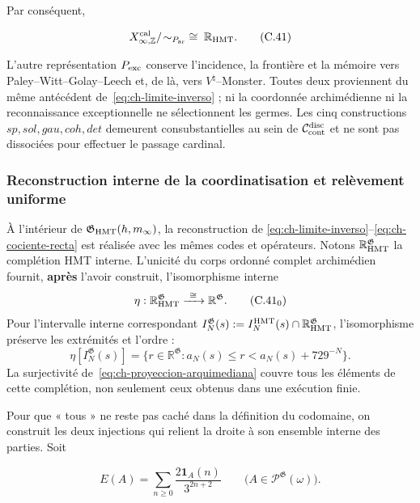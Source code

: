 Par conséquent,

\[
 X_{\infty,\mathbb Z}^{\rm cal}/\!\sim_{P_{\rm ar}}
 \;\cong\;\mathbb R_{\rm HMT}.
\tag{C.41}\label{eq:ch-cociente-recta}
\]

L'autre représentation \(P_{\rm exc}\) conserve l'incidence, la frontière et la mémoire vers Paley--\allowbreak Witt--\allowbreak Golay--\allowbreak Leech et, de là, vers \(V^\natural\)--Monster. Toutes deux proviennent du même antécédent de~\eqref{eq:ch-limite-inverso} ; ni la coordonnée archimédienne ni la reconnaissance exceptionnelle ne sélectionnent les germes. Les cinq constructions \(sp,sol,gau,coh,det\) demeurent consubstantielles au sein de \(\mathcal C_{\rm cont}^{\rm disc}\) et ne sont pas dissociées pour effectuer le passage cardinal.



\subsubsection{Reconstruction interne de la coordinatisation et relèvement uniforme}

À l'intérieur de \(\mathfrak G_{\rm HMT}(h,m_\infty)\), la reconstruction de \eqref{eq:ch-limite-inverso}--\eqref{eq:ch-cociente-recta} est réalisée avec les mêmes codes et opérateurs. Notons \(\mathbb R_{\rm HMT}^{\mathfrak G}\) la complétion HMT interne. L'unicité du corps ordonné complet archimédien fournit, \textbf{après} l'avoir construit, l'isomorphisme interne
\[
 \eta:\mathbb R_{\rm HMT}^{\mathfrak G}
 \xrightarrow{\ \cong\ }\mathbb R^{\mathfrak G}.
\tag{C.41$_0$}\label{eq:ch-isomorfismo-interno}
\]
Pour l’intervalle interne correspondant
\(I_N^{\mathfrak G}(s):=
 I_N^{\rm HMT}(s)\cap\mathbb R_{\rm HMT}^{\mathfrak G}\), l’isomorphisme
préserve les extrémités et l’ordre :
\[
 \eta[I_N^{\mathfrak G}(s)]
 =\{r\in\mathbb R^{\mathfrak G}:
      a_N(s)\le r<a_N(s)+729^{-N}\}.
\tag{C.41$_0$a}\label{eq:ch-intervalos-internos}
\]
La surjectivité de~\eqref{eq:ch-proyeccion-arquimediana} couvre tous les éléments de cette complétion, non
seulement ceux obtenus dans une exécution finie.

Pour que « tous » ne reste pas caché dans la définition du codomaine, on construit
les deux injections qui relient la droite à son ensemble interne des parties. Soit

\[
 E(A)=\sum_{n\ge0}\frac{2\mathbf1_A(n)}{3^{2n+2}}
 \qquad
 \bigl(A\in\mathcal P^{\mathfrak G}(\omega)\bigr).
\tag{C.41a}\label{eq:ch-incrustacion-cantor}
\]

